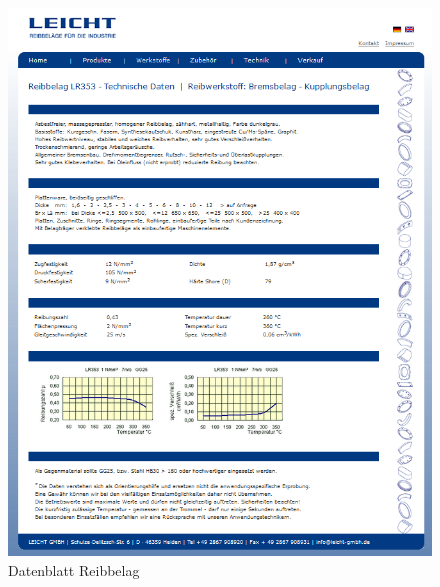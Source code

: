 	\begin{figure}[H]
	\vspace{-2cm}
	\includegraphics[width=1.0773\textwidth,keepaspectratio]{figures/Reibbelag.png}
	\caption{Datenblatt Reibbelag \protect\cite{bib:www:reibbelag}}
	\label{fig:Reibbelag}
\end{figure}
